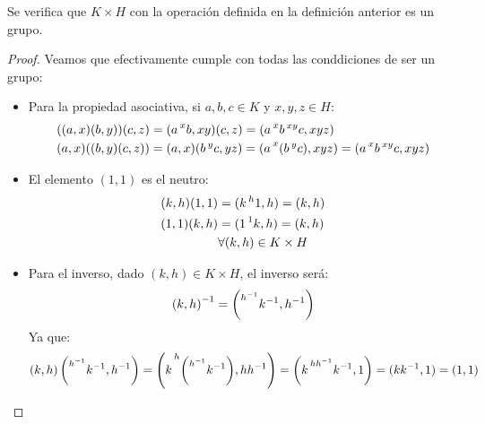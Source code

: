 \begin{prop}
    Se verifica que $K\times H$ con la operación definida en la definición anterior es un grupo.
    \begin{proof}
        Veamos que efectivamente cumple con todas las conddiciones de ser un grupo:
        \begin{itemize}
            \item Para la propiedad asociativa, si $a,b,c\in K$ y $x,y,z\in H$:
                \begin{align*}
                    ((a,x)(b,y))(c,z) &= (a\prescript{x}{}{b},xy)(c,z) = (a\prescript{x}{}{b}\prescript{xy}{}{c}, xyz) \\
                    (a,x)((b,y)(c,z)) &= (a,x)(b\prescript{y}{}{c}, yz) = (a\prescript{x}{}{(b\prescript{y}{}{c})}, xyz) = (a\prescript{x}{}{b}\prescript{xy}{}{c},xyz)
                \end{align*}
            \item El elemento $(1,1)$ es el neutro:
                \begin{align*}
                    (k,h)(1,1) &= (k\prescript{h}{}{1},h) = (k,h) \\
                    (1,1)(k,h) &= (1 \prescript{1}{}{k},h) = (k,h) \\
                               &\forall (k,h)\in K\times H
                \end{align*}
            \item Para el inverso, dado $(k,h)\in K\times H$, el inverso será:
                \begin{equation*}
                    {(k,h)}^{-1} = \left(\prescript{h^{-1}}{}{k^{-1}},h^{-1}\right)
                \end{equation*}
                Ya que:
                \begin{equation*}
                    (k,h)\left(\prescript{h^{-1}}{}{k^{-1}},h^{-1}\right) = \left(k\prescript{h}{}{\left(\prescript{h^{-1}}{}{k^{-1}}\right)}, hh^{-1}\right) = \left(k\prescript{hh^{-1}}{}{k^{-1}}, 1\right) = (kk^{-1},1) = (1,1)
                \end{equation*}
        \end{itemize}
    \end{proof}
\end{prop}

